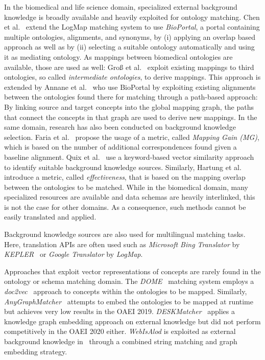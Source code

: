 \documentclass[runningheads]{llncs}
\begin{document}
In the biomedical and life science domain, specialized external background knowledge is broadly available and heavily exploited for ontology matching. Chen et al.~\cite{DBLP:conf/semweb/ChenXJC14} extend the LogMap matching system to use \textit{BioPortal}, a portal containing multiple ontologies, alignments, and synonyms, by (i) applying an overlap based approach as well as by (ii) selecting a suitable ontology automatically and using it as mediating ontology. As mappings between biomedical ontologies are available, those are used as well: Groß et al.~\cite{DBLP:conf/icbo/GrossHKR11} exploit existing mappings to third ontologies, so called \textit{intermediate ontologies}, to derive mappings. This approach is extended by Annane et al.~\cite{DBLP:conf/ekaw/AnnaneBAJ16} who use BioPortal by exploiting existing alignments between the ontologies found there for matching through a path-based approach: By linking source and target concepts into the global mapping graph, the paths that connect the concepts in that graph are used to derive new mappings. 
In the same domain, research has also been conducted on background knowledge selection. Faria et al.~\cite{faria2014automatic} propose the usage of a metric, called \textit{Mapping Gain (MG)}, which is based on the number of additional correspondences found given a baseline alignment. Quix et al.~\cite{DBLP:conf/sigmod/QuixRK11} use a keyword-based vector similarity approach to identify suitable background knowledge sources. Similarly, Hartung et al.~\cite{DBLP:conf/esws/HartungGKR12} introduce a metric, called \textit{effectiveness}, that is based on the mapping overlap between the ontologies to be matched. 
While in the biomedical domain, many specialized resources are available and data schemas are heavily interlinked, this is not the case for other domains. As a consequence, such methods cannot be easily translated and applied.

Background knowledge sources are also used for multilingual matching tasks. Here, translation APIs are often used such as \textit{Microsoft Bing Translator} by \textit{KEPLER}~\cite{kepler_oaei_18} or \textit{Google Translator} by \textit{LogMap}.

Approaches that exploit vector representations of concepts are rarely found in the ontology or schema matching domain. The \textit{DOME}~\cite{dome} matching system employs a \textit{doc2vec}~\cite{doc2vec} approach to concepts within the ontologies to be mapped. Similarly, \textit{AnyGraphMatcher}~\cite{agm} attempts to embed the ontologies to be mapped at runtime but achieves very low results in the OAEI 2019.
\emph{DESKMatcher}~\cite{DBLP:conf/semweb/MonychPHP20} applies a knowledge graph embedding approach on external knowledge but did not perform competitively in the OAEI 2020 either. \textit{WebIsAlod} is exploited as external background knowledge in~\cite{DBLP:conf/semweb/PortischHP20a} through a combined string matching and graph embedding strategy. 
\end{document}

